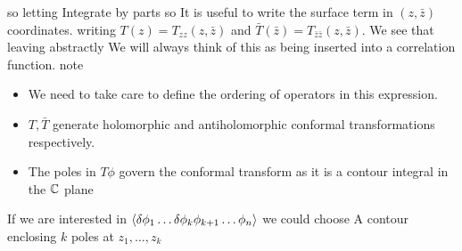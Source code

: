 \documentclass{article}
\begin{document}
so 
letting 
Integrate by parts so 
It is useful to write the surface term in $(z,\bar{z})$ coordinates. 
writing $T(z) = T_{zz}(z,\bar{z})$ and $\bar{T}(\bar{z}) = T_{\bar{z}\bar{z}}(z,\bar{z})$. We see that 
leaving 
abstractly 
We will always think of this as being inserted into a correlation function. 
note \begin{itemize}
    \item We need to take care to define the ordering of operators in this expression. 
 \item $T,\bar{T}$ generate holomorphic and antiholomorphic conformal transformations respectively.
 \item The poles in $T\phi$ govern the conformal transform as it is a contour integral in the $\mathbb{C}$ plane 
\end{itemize}
If we are interested in $\braket{\delta \phi_1 \dots \delta \phi_k \phi_{k+1} \dots \phi_n }$ we could choose A contour enclosing $k$ poles at $z_1 , \dots, z_k$
\end{document}
